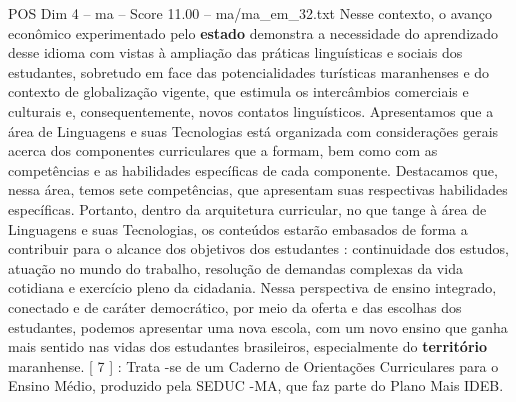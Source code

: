 \begin{textsample}{POS Dim 4 – ma – Score 11.00 – ma/ma\_em\_32.txt}
Nesse contexto, o avanço econômico experimentado pelo \textbf{estado} demonstra a necessidade do aprendizado desse idioma com vistas à ampliação das práticas linguísticas e sociais dos estudantes, sobretudo em face das potencialidades turísticas maranhenses e do contexto de globalização vigente, que estimula os intercâmbios comerciais e culturais e, consequentemente, novos contatos linguísticos.
Apresentamos que a área de Linguagens e suas Tecnologias está organizada com considerações gerais acerca dos componentes curriculares que a formam, bem como com as competências e as habilidades específicas de cada componente.
Destacamos que, nessa área, temos sete competências, que apresentam suas respectivas habilidades específicas.
Portanto, dentro da arquitetura curricular, no que tange à área de Linguagens e suas Tecnologias, os conteúdos estarão embasados de forma a contribuir para o alcance dos objetivos dos estudantes : continuidade dos estudos, atuação no mundo do trabalho, resolução de demandas complexas da vida cotidiana e exercício pleno da cidadania.
Nessa perspectiva de ensino integrado, conectado e de caráter democrático, por meio da oferta e das escolhas dos estudantes, podemos apresentar uma nova escola, com um novo ensino que ganha mais sentido nas vidas dos estudantes brasileiros, especialmente do \textbf{território} maranhense. [ 7 ] : Trata -se de um Caderno de Orientações Curriculares para o Ensino Médio, produzido pela SEDUC -MA, que faz parte do Plano Mais IDEB.

\end{textsample}

